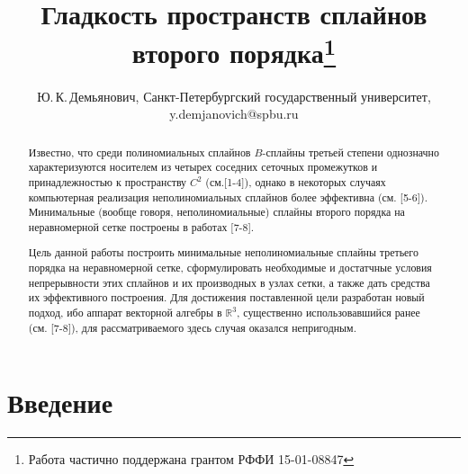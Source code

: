 \documentclass{spisok-article}
\title{Гладкость пространств сплайнов второго порядка\thanks{Работа частично поддержана грантом РФФИ 15-01-08847}}
\author{Ю.$\,$К.$\,$Демьянович, Санкт-Петербургский государственный университет, y.demjanovich@spbu.ru}
\begin{document}
\maketitle

\begin{abstract}
      Известно, что среди полиномиальных сплайнов
       $B$-сплайны третьей степени однозначно характеризуются носителем
      из четырех  соседних сеточных промежутков  и
      принадлежностью к пространству $C^2$ (см.[1-4]), однако
       в некоторых случаях  компьютерная реализация
      неполиномиальных сплайнов более эффективна (см. [5-6]).
        Минимальные (вообще говоря, неполиномиальные)
      сплайны второго порядка на неравномерной сетке построены в
      работах [7-8].

      Цель данной работы построить  минимальные  неполиномиальные
      сплайны третьего порядка на неравномерной сетке, сформулировать
      необходимые и достатчные условия непрерывности этих сплайнов и их
      производных в узлах сетки, а также дать средства их
      эффективного построения.  Для достижения поставленной
      цели разработан новый подход, ибо аппарат векторной алгебры в ${\mathbb
      R}^3$, существенно использовавшийся ранее (см. [7-8]),
      для рассматриваемого здесь  случая  оказался непригодным.
\end{abstract}

\section{Введение}
\end{document}
